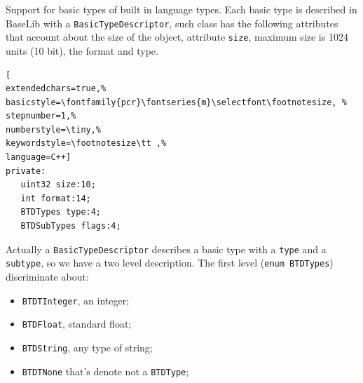 Support for basic types of built in language types. Each basic type is described in BaseLib with a \texttt{BasicTypeDescriptor}, such class has the following attributes that account about the size of the object, attribute \texttt{size}, maximum size is 1024 units (10 bit), the format and type.

\begin{lstlisting}[
extendedchars=true,%
basicstyle=\fontfamily{pcr}\fontseries{m}\selectfont\footnotesize, %
stepnumber=1,%
numberstyle=\tiny,%
keywordstyle=\footnotesize\tt ,%
language=C++]
private:
   uint32 size:10;
   int format:14;
   BTDTypes type:4;
   BTDSubTypes flags:4;
\end{lstlisting}

Actually a \texttt{BasicTypeDescriptor} describes a basic type with a \texttt{type} and a \texttt{subtype}, so we have a two level description. The first level (\texttt{enum BTDTypes}) discriminate about:
\begin{itemize}
 \item \texttt{BTDTInteger}, an integer;
 \item \texttt{BTDFloat}, standard float;
 \item \texttt{BTDString}, any type of string;
 \item \texttt{BTDTNone} that's denote not a \texttt{BTDType};
\end{itemize}

